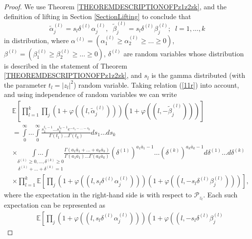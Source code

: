 \documentclass[12pt]{amsart}
\theoremstyle{definition}
\numberwithin{equation}{section}
\begin{document}
\begin{proof}
We use Theorem \ref{THEOREMDESCRIPTIONOFPz1z2zk}, and the definition of lifting in Section \ref{SectionLifting} to conclude that
\begin{equation}\label{11r}
\widetilde{\alpha}_j^{(l)}=s_l\delta^{(l)}\alpha_j^{(l)},\;\;
\widetilde{\beta}_j^{(l)}=s_l\delta^{(l)}\beta_j^{(l)};\;\; l=1,\ldots,k
\end{equation}
in distribution, where $\alpha^{(l)}=\left(\alpha_1^{(l)}\geq\alpha_2^{(l)}\geq\ldots\geq 0\right)$, $\beta^{(l)}=\left(\beta_1^{(l)}\geq\beta_2^{(l)}\geq\ldots\geq 0\right)$,  $\delta^{(l)}$ are random variables whose distribution is described in  the statement of Theorem \ref{THEOREMDESCRIPTIONOFPz1z2zk}, and $s_l$ is the gamma distributed (with the parameter $t_l=|z_l|^2$) random variable. Taking relation (\ref{11r}) into account, and using independence  of random variables we can write
\begin{equation}\label{11.7.Ex}
\begin{split}
&\mathbb{E}\left[\prod\limits_{l=1}^k\prod\limits_{j}\left(1+\varphi\left(\left(l,\widetilde{\alpha}_j^{(l)}\right)\right)\right)\left(1+\varphi\left(\left(l,-\widetilde{\beta}_j^{(l)}
\right)\right)\right)\right]\\
&=\int\limits_0^{\infty}\ldots\int\limits_0^{\infty}
\frac{s_1^{t_1-1}\ldots s_k^{t_k-1}e^{-s_1-\ldots-s_k}}{\Gamma(t_1)\ldots\Gamma(t_k)}
ds_1\ldots ds_k\\
&\times\underset{\delta^{(1)}+\ldots+\delta^{(k)}=1}{\underset{\delta^{(1)}\geq 0,\ldots, \delta^{(k)}\geq 0}{\int\ldots\int}}
\frac{\Gamma\left(a_1\bar{a}_1+\ldots+a_k\bar{a}_k\right)}{\Gamma\left(a_1\bar{a}_1\right)\ldots\Gamma\left(a_k\bar{a}_k\right)}
\left(\delta^{(1)}\right)^{a_1\bar{a}_1-1}\ldots\left(\delta^{(k)}\right)^{a_k\bar{a}_k-1}
d\delta^{(1)}\ldots d\delta^{(k)}\\
&\times\prod\limits_{l=1}^k\mathbb{E}
\left[\prod\limits_{j}
\left(1+\varphi\left(\left(l,s_l\delta^{(l)}\alpha_j^{(l)}\right)\right)\right)
\left(1+\varphi\left(\left(l,-s_l\delta^{(l)}\beta_j^{(l)}
\right)\right)\right)\right],
\end{split}
\end{equation}
where the expectation in the right-hand side is with respect to $\mathcal{P}_{z_l}$.
Each such expectation can be represented as
\begin{equation}\label{11.8.Ex}
\begin{split}
&\mathbb{E}
\left[\prod\limits_{j}
\left(1+\varphi\left(\left(l,s_l\delta^{(l)}\alpha_j^{(l)}\right)\right)\right)
\left(1+\varphi\left(\left(l,-s_l\delta^{(l)}\beta_j^{(l)}

\end{split}
\end{equation}
\end{proof}
\end{document}
